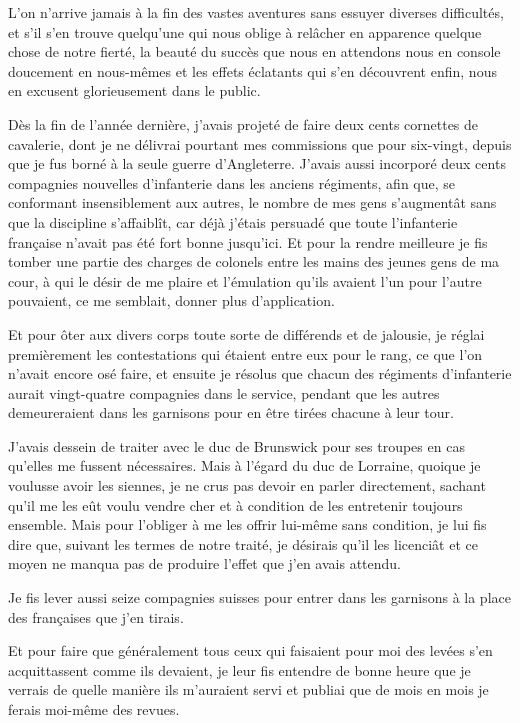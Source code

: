 \documentclass[french,twoside]{book} %
\begin{document}
L’on n’arrive jamais à la fin des vastes aventures sans essuyer diverses difficultés, et s’il s’en trouve quelqu’une qui nous oblige à relâcher en apparence quelque chose de notre fierté, la beauté du succès que nous en attendons nous en console doucement en nous-mêmes et les effets éclatants qui s’en découvrent enfin, nous en excusent glorieusement dans le public.\par
Dès la fin de l’année dernière, j’avais projeté de faire deux cents cornettes de cavalerie, dont je ne délivrai pourtant mes commissions que pour six-vingt, depuis que je fus borné à la seule guerre d’Angleterre. J’avais aussi incorporé deux cents compagnies nouvelles d’infanterie dans les anciens régiments, afin que, se conformant insensiblement aux autres, le nombre de mes gens s’augmentât sans que la discipline s’affaiblît, car déjà j’étais persuadé que toute l’infanterie française n’avait pas été fort bonne jusqu’ici. Et pour la rendre meilleure je fis tomber une partie des charges de colonels entre les mains des jeunes gens de ma cour, à qui le désir de me plaire et l’émulation qu’ils avaient l’un pour l’autre pouvaient, ce me semblait, donner plus d’application.\par
Et pour ôter aux divers corps toute sorte de différends et de jalousie, je réglai premièrement les contestations qui étaient entre eux pour le rang, ce que l’on n’avait encore osé faire, et ensuite je résolus que chacun des régiments d’infanterie aurait vingt-quatre compagnies dans le service, pendant que les autres demeureraient dans les garnisons pour en être tirées chacune à leur tour.\par
J’avais dessein de traiter avec le duc de Brunswick pour ses troupes en cas qu’elles me fussent nécessaires. Mais à l’égard du duc de Lorraine, quoique je voulusse avoir les siennes, je ne crus pas devoir en parler directement, sachant qu’il me les eût voulu vendre cher et à condition de les entretenir toujours ensemble. Mais pour l’obliger à me les offrir lui-même sans condition, je lui fis dire que, suivant les termes de notre traité, je désirais qu’il les licenciât et ce moyen ne manqua pas de produire l’effet que j’en avais attendu.\par
Je fis lever aussi seize compagnies suisses pour entrer dans les garnisons à la place des françaises que j’en tirais.\par
Et pour faire que généralement tous ceux qui faisaient pour moi des levées s’en acquittassent comme ils devaient, je leur fis entendre de bonne heure que je verrais de quelle manière ils m’auraient servi et publiai que de mois en mois je ferais moi-même des revues.\par
\end{document}
